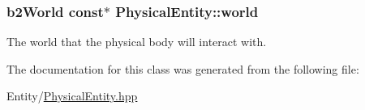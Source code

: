 \subsubsection[{world}]{\setlength{\rightskip}{0pt plus 5cm}b2\+World const$\ast$ Physical\+Entity\+::world\hspace{0.3cm}{\ttfamily [protected]}}\label{class_physical_entity_ae6c23c3817c4d7f9a867abed05cd7834}
The world that the physical body will interact with. 

The documentation for this class was generated from the following file\+:\begin{DoxyCompactItemize}
\item 
Entity/\hyperlink{_physical_entity_8hpp}{Physical\+Entity.\+hpp}\end{DoxyCompactItemize}
